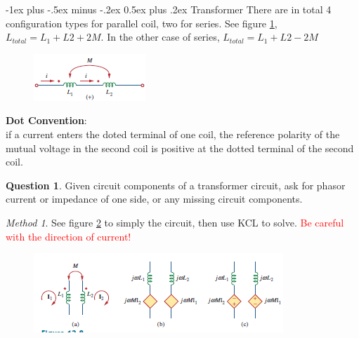 \documentclass[10pt,landscape]{article}
\makeatletter
\renewcommand{\section}{\@startsection{section}{1}{0mm}%
                                {-1ex plus -.5ex minus -.2ex}%
                                {0.5ex plus .2ex}%
                                {\normalfont\large\bfseries}}
\newcommand\todo[1]{\textcolor{red}{#1}}
\theoremstyle{definition}
\newtheorem*{question}{Question}
\theoremstyle{remark}
\newtheorem*{method}{Method}
\makeatother
\begin{document}
\begin{multicols}{3}
\section{Transformer}
There are in total 4 configuration types for parallel coil, two for series. See figure \ref{fig:trans_series}, $L_{total} = L_1 + L2 + 2M$. In the other case of series,  $L_{total} = L_1 + L2 - 2M$

\begin{figure}[H]
    \centering
    \includegraphics[width=0.5\linewidth]{202/figure/transformer_2_a.png}
    \caption{}
    \label{fig:trans_series}
\end{figure}

\textbf{Dot Convention}: \\
if a current enters the doted terminal of one coil, the reference polarity of the mutual voltage in the second coil is positive at the dotted terminal of the second coil.

\begin{question}
Given circuit components of a transformer circuit, ask for phasor current or impedance of one side, or any missing circuit components. 
\end{question}

\begin{method}
See figure \ref{fig:trans_simplification} to simply the circuit, then use KCL to solve. \todo{Be careful with the direction of current!}
\end{method}

\begin{figure}[H]
    \centering
    \includegraphics[width=\linewidth]{202/figure/transformer_1.png}
    \caption{}
    \label{fig:trans_simplification}
\end{figure}



\end{multicols}
\end{document}
